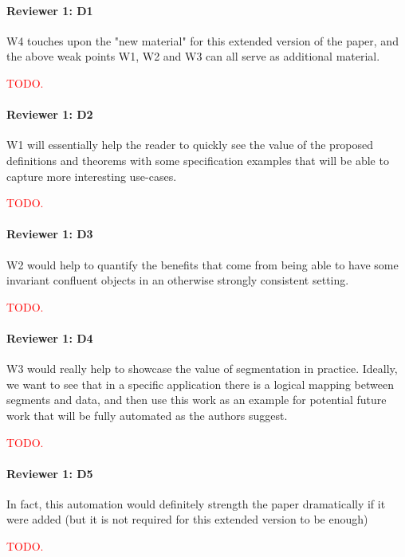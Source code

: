 \documentclass[9pt]{article}
\begin{document}
\begin{multicols*}{2}
\paragraph{Reviewer 1: D1}
\begin{feedback}
  W4 touches upon the "new material" for this extended version of the paper,
  and the above weak points W1, W2 and W3 can all serve as additional material.
\end{feedback}
\textcolor{red}{TODO.}

\paragraph{Reviewer 1: D2}
\begin{feedback}
  W1 will essentially help the reader to quickly see the value of the proposed
  definitions and theorems with some specification examples that will be able
  to capture more interesting use-cases.
\end{feedback}
\textcolor{red}{TODO.}

\paragraph{Reviewer 1: D3}
\begin{feedback}
  W2 would help to quantify the benefits that come from being able to have some
  invariant confluent objects in an otherwise strongly consistent setting.
\end{feedback}
\textcolor{red}{TODO.}

\paragraph{Reviewer 1: D4}
\begin{feedback}
  W3 would really help to showcase the value of segmentation in practice.
  Ideally, we want to see that in a specific application there is a logical
  mapping between segments and data, and then use this work as an example for
  potential future work that will be fully automated as the authors suggest.
\end{feedback}
\textcolor{red}{TODO.}

\paragraph{Reviewer 1: D5}
\begin{feedback}
  In fact, this automation would definitely strength the paper dramatically if
  it were added (but it is not required for this extended version to be enough)
\end{feedback}
\textcolor{red}{TODO.}


\end{multicols*}
\end{document}
